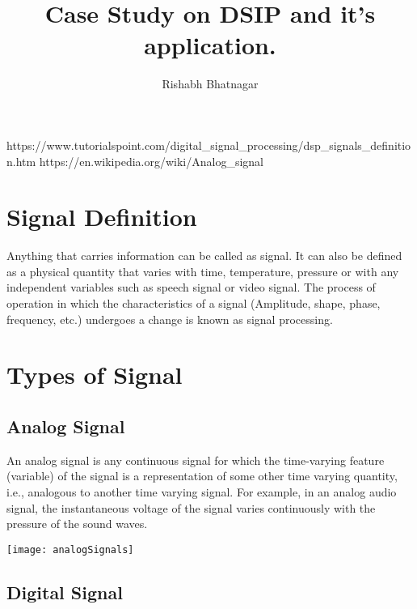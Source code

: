 \documentclass{article}
\newenvironment{Figure}
 {\par\medskip\noindent{\linewidth}}
 {\endminipage\par\medskip}
\begin{document}
   \title{Case Study on DSIP and it's application.}                           
    \author{Rishabh Bhatnagar}
    \maketitle
    \tableofcontents
    \newpage

    \begin{thebibliography}{9}
     https://www.tutorialspoint.com/digital\_signal\_processing/dsp\_signals\_definition.htm
     https://en.wikipedia.org/wiki/Analog\_signal
    \end{thebibliography}
    
    \begin{multicols}{2}
    \section{Signal Definition}
    Anything that carries information can be called as signal. It can also be defined as a physical quantity that varies with time, temperature, pressure or with any independent variables such as speech signal or video signal. The process of operation in which the characteristics of a signal (Amplitude, shape, phase, frequency, etc.) undergoes a change is known as signal processing. 
    \cite{tpSignal}
    \section{Types of Signal}
        \subsection{Analog Signal}
        An analog signal is any continuous signal for which the time-varying feature (variable) of the signal is a representation of some other time varying quantity, i.e., analogous to another time varying signal. For example, in an analog audio signal, the instantaneous voltage of the signal varies continuously with the pressure of the sound waves.\cite{wikiAnalog}
        \begin{Figure}
         \centering
          \texttt{[image: analogSignals]}
           \end{Figure}
        \subsection{Digital Signal}

\end{multicols}
\end{document}
